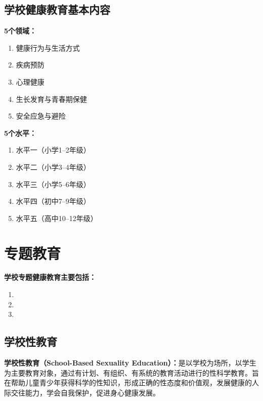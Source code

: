 \subsection{学校健康教育基本内容}

\begin{keybox}
\textbf{5个领域：}
\begin{enumerate}[leftmargin=*]
    \item 健康行为与生活方式
    \item 疾病预防
    \item 心理健康
    \item 生长发育与青春期保健
    \item 安全应急与避险
\end{enumerate}

\textbf{5个水平：}
\begin{enumerate}[leftmargin=*]
    \item 水平一（小学1--2年级）
    \item 水平二（小学3--4年级）
    \item 水平三（小学5--6年级）
    \item 水平四（初中7--9年级）
    \item 水平五（高中10--12年级）
\end{enumerate}
\end{keybox}

\section{专题教育}

\begin{defbox}
\textbf{学校专题健康教育主要包括：}
\begin{enumerate}[leftmargin=*]
    \item {}
    \item {}
    \item {}
\end{enumerate}
\end{defbox}

\subsection{学校性教育}

\begin{defbox}
\textbf{学校性教育（School-Based Sexuality Education）：}是以学校为场所，以学生为主要教育对象，通过有计划、有组织、有系统的教育活动进行的性科学教育。旨在帮助儿童青少年获得科学的性知识，形成正确的性态度和价值观，发展健康的人际交往能力，学会自我保护，促进身心健康发展。
\end{defbox}

